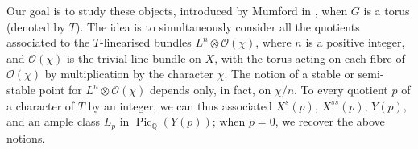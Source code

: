 \documentclass{article}
\newcommand{\sh}{\mathscr}
\DeclareMathOperator{\Pic}{Pic}
\newcommand{\oldpage}[1]{\marginpar{\footnotesize$\Big\vert$ \textit{p.~#1}}}
\begin{document}
Our goal is to study these objects, introduced by Mumford in \cite{MF}, when $G$ is a torus (denoted by $T$).
The idea is to simultaneously consider all the quotients associated to the $T$-linearised bundles $L^n\otimes\sh{O}(\chi)$, where $n$ is a positive integer, and $\sh{O}(\chi)$ is the trivial line bundle on $X$, with the torus acting on each fibre of $\sh{O}(\chi)$ by multiplication by the character $\chi$.
The notion of a stable or semi-stable point for $L^n\otimes\sh{O}(\chi)$ depends only, in fact, on $\chi/n$.
\oldpage{510}
To every quotient $p$ of a character of $T$ by an integer, we can thus associated $X^s(p)$, $X^{ss}(p)$, $Y(p)$, and an ample class $L_p$ in $\Pic_\mathbb{Q}(Y(p))$;
when $p=0$, we recover the above notions.



\nocite{*}

\end{document}
